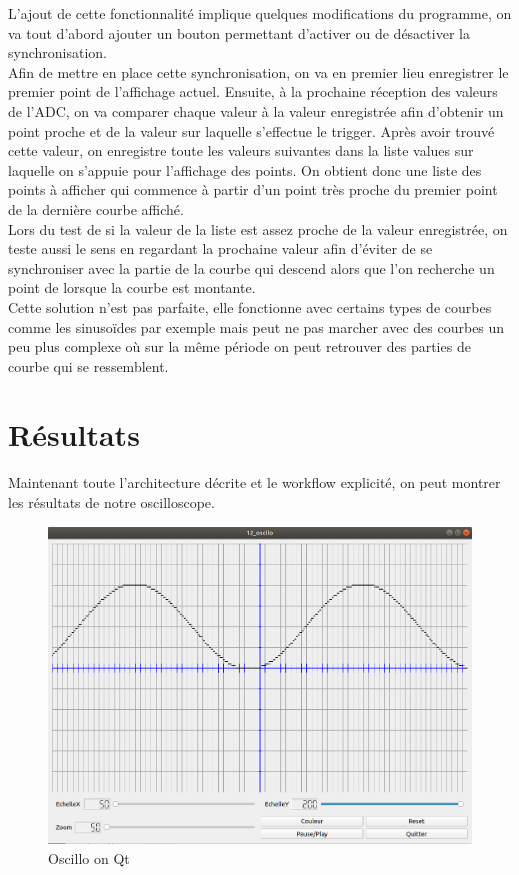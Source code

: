 \documentclass[11pt, french]{article}
\begin{document}
L'ajout de cette fonctionnalité implique quelques modifications du programme, on va tout d’abord ajouter un bouton permettant d’activer ou de désactiver la synchronisation.\\ 

Afin de mettre en place cette synchronisation, on va en premier lieu enregistrer le premier point de l’affichage actuel. Ensuite, à la prochaine réception des valeurs de l’ADC, on va comparer chaque valeur à la valeur enregistrée afin d’obtenir un point proche et de la valeur sur laquelle s’effectue le trigger. Après avoir trouvé cette valeur, on enregistre toute les valeurs suivantes dans la liste values sur laquelle on s’appuie pour l’affichage des points. On obtient donc une liste des points à afficher qui commence à partir d’un point très proche du premier point de la dernière courbe affiché.\\ 

Lors du test de si la valeur de la liste est assez proche de la valeur enregistrée, on teste aussi le sens en regardant la prochaine valeur afin d’éviter de se synchroniser avec la partie de la courbe qui descend alors que l’on recherche un point de lorsque la courbe est montante.\\

Cette solution n’est pas parfaite, elle fonctionne avec certains types de courbes comme les sinusoïdes par exemple mais peut ne pas marcher avec des courbes un peu plus complexe où sur la même période on peut retrouver des parties de courbe qui se ressemblent.\\


\newpage

\section{Résultats}

Maintenant toute l'architecture décrite et le workflow explicité, on peut montrer les résultats de notre oscilloscope.

\vspace*{0.1cm}
\begin{figure}[htb]
\centering
\includegraphics[width=14cm]{oscillo.png}
\caption{Oscillo on Qt}
\label{fig:oscillo}
\end{figure}
\vspace*{0.1cm}
\end{document}
